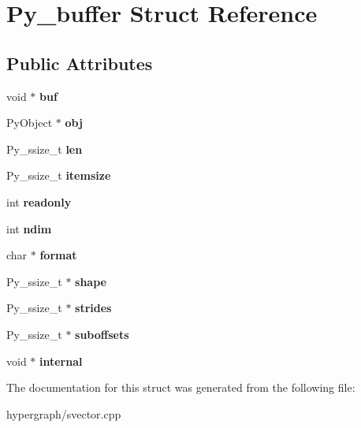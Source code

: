 \hypertarget{structPy__buffer}{
\section{Py\_\-buffer Struct Reference}
\label{structPy__buffer}
}
\subsection*{Public Attributes}
\begin{DoxyCompactItemize}
\item 
\hypertarget{structPy__buffer_a1bd45f087213a20423e1f0676d7dfb65}{
void $\ast$ {\bfseries buf}}
\label{structPy__buffer_a1bd45f087213a20423e1f0676d7dfb65}

\item 
\hypertarget{structPy__buffer_a7e7e32b0da3e9423473a0941fbaa6ebc}{
PyObject $\ast$ {\bfseries obj}}
\label{structPy__buffer_a7e7e32b0da3e9423473a0941fbaa6ebc}

\item 
\hypertarget{structPy__buffer_a483ee64f1491c16b2e35b840b9531892}{
Py\_\-ssize\_\-t {\bfseries len}}
\label{structPy__buffer_a483ee64f1491c16b2e35b840b9531892}

\item 
\hypertarget{structPy__buffer_a2c4ef3bf1e26c5bd4b968303aca61817}{
Py\_\-ssize\_\-t {\bfseries itemsize}}
\label{structPy__buffer_a2c4ef3bf1e26c5bd4b968303aca61817}

\item 
\hypertarget{structPy__buffer_a7504670b8c7dc73da34303ccaa1647e3}{
int {\bfseries readonly}}
\label{structPy__buffer_a7504670b8c7dc73da34303ccaa1647e3}

\item 
\hypertarget{structPy__buffer_abe900245be1dff2d90436cf0b17b7f4a}{
int {\bfseries ndim}}
\label{structPy__buffer_abe900245be1dff2d90436cf0b17b7f4a}

\item 
\hypertarget{structPy__buffer_ae86752d62824fad686253274701576c0}{
char $\ast$ {\bfseries format}}
\label{structPy__buffer_ae86752d62824fad686253274701576c0}

\item 
\hypertarget{structPy__buffer_a9d9ed90fab396878f292927b8fff68fa}{
Py\_\-ssize\_\-t $\ast$ {\bfseries shape}}
\label{structPy__buffer_a9d9ed90fab396878f292927b8fff68fa}

\item 
\hypertarget{structPy__buffer_a1ecb1c96e4f524b9c9c14f1f09fd55b0}{
Py\_\-ssize\_\-t $\ast$ {\bfseries strides}}
\label{structPy__buffer_a1ecb1c96e4f524b9c9c14f1f09fd55b0}

\item 
\hypertarget{structPy__buffer_a6bc1c34dab6b1bd87edf3e9d03d07d12}{
Py\_\-ssize\_\-t $\ast$ {\bfseries suboffsets}}
\label{structPy__buffer_a6bc1c34dab6b1bd87edf3e9d03d07d12}

\item 
\hypertarget{structPy__buffer_aed20ad573db431c12bfbf09ed2441247}{
void $\ast$ {\bfseries internal}}
\label{structPy__buffer_aed20ad573db431c12bfbf09ed2441247}

\end{DoxyCompactItemize}


The documentation for this struct was generated from the following file:\begin{DoxyCompactItemize}
\item 
hypergraph/svector.cpp\end{DoxyCompactItemize}
